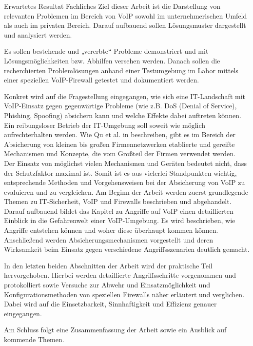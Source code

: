\begin{section}{Erwartetes Resultat}
Fachliches Ziel dieser Arbeit ist die Darstellung von relevanten Problemen im Bereich von VoIP sowohl im unternehmerischen Umfeld als auch im privaten Bereich. Darauf aufbauend sollen Lösungsmuster dargestellt und analysiert werden. 

Es sollen bestehende und „vererbte“ Probleme demonstriert und mit Lösungsmöglichkeiten bzw. Abhilfen versehen werden. 
Danach sollen die recherchierten Problemlösungen anhand einer Testumgebung im Labor mittels einer speziellen VoIP-Firewall getestet und dokumentiert werden.

Konkret wird auf die Fragestellung eingegangen, wie sich eine IT-Landschaft mit VoIP-Einsatz gegen gegenwärtige Probleme (wie z.B. DoS (Denial of Service), Phishing, Spoofing) absichern kann und welche Effekte dabei auftreten können. Ein reibungsloser Betrieb der IT-Umgebung soll soweit wie möglich aufrechterhalten werden.
Wie Qu et al. in \cite{Qu:2009:desactv}  beschreiben, gibt es im Bereich der Absicherung von kleinen bis großen Firmennetzwerken  etablierte und gereifte Mechanismen und Konzepte, die vom Großteil der Firmen verwendet werden. 
\\
Der Einsatz von möglichst vielen Mechanismen und Geräten bedeutet nicht, dass der Schutzfaktor maximal ist. Somit ist es aus vielerlei Standpunkten wichtig, entsprechende Methoden und Vorgehensweisen bei der Absicherung von VoIP zu evaluieren und zu vergleichen.
Am Beginn der Arbeit werden zuerst grundlegende Themen zu IT-Sicherheit, VoIP und Firewalls beschrieben und abgehandelt. Darauf aufbauend bildet das Kapitel zu Angriffe auf VoIP einen detaillierten Einblick in die Gefahrenwelt einer VoIP-Umgebung. Es wird beschrieben, wie Angriffe entstehen können und woher diese überhaupt kommen können. Anschließend werden  Absicherungsmechanismen vorgestellt und deren Wirksamkeit beim Einsatz gegen verschiedene Angriffsszenarien deutlich gemacht.

In den letzten beiden Abschnitten der Arbeit wird der praktische Teil hervorgehoben. Hierbei werden detaillierte Angriffsschritte vorgenommen und protokolliert sowie Versuche zur Abwehr und Einsatzmöglichkeit und Konfigurationsmethoden von speziellen Firewalls näher erläutert und verglichen. Dabei wird auf die Einsetzbarkeit, Sinnhaftigkeit und Effizienz genauer eingegangen.

Am Schluss folgt eine Zusammenfassung der Arbeit sowie ein Ausblick auf kommende Themen.
\end{section}
\pagebreak

